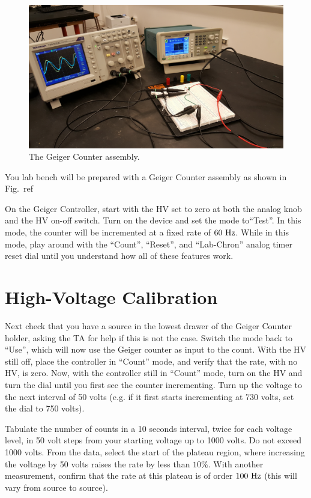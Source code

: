 \begin{figure}[htbp]
\begin{center}
\includegraphics[height=0.22\textheight]{figs/labs/filters/filter_setup.jpg}
\end{center}
\caption{\label{fig:geiger_setup} The Geiger Counter assembly.}
\end{figure}

You lab bench will be prepared with a Geiger Counter assembly as shown in Fig.~ref

On the Geiger Controller, start with the HV set to zero at both the analog knob and the HV on-off switch.   Turn on the device and set the mode to``Test''.  In this mode, the counter will be incremented at a fixed rate of $60~\rm Hz$.   While in this mode, play around with the ``Count'', ``Reset'', and ``Lab-Chron'' analog timer reset dial until you understand how all of these features work.


\section{High-Voltage Calibration}

Next check that you have a source in the lowest drawer of the Geiger Counter holder, asking the TA for help if this is not the case.  Switch the mode back to ``Use'', which will now use the Geiger counter as input to the count.  With the HV still off, place the controller in ``Count'' mode, and verify that the rate, with no HV, is zero.  Now, with the controller still in ``Count'' mode, turn on the HV and turn the dial until you first see the counter incrementing.  Turn up the voltage to the next interval of 50 volts (e.g. if it first starts incrementing at 730 volts, set the dial to 750 volts).

Tabulate the number of counts in a 10 seconds interval, twice for each voltage level, in 50 volt steps from your starting voltage up to 1000 volts.  Do not exceed 1000 volts.  From the data, select the start of the plateau region, where increasing the voltage by 50 volts raises the rate by less than $10\%$.  With another measurement, confirm that the rate at this plateau is of order $100~\rm Hz$ (this will vary from source to source).

